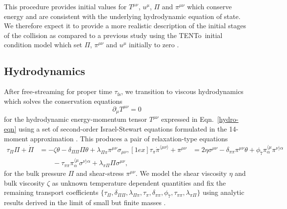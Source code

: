 \documentclass[aps,prc,reprint,amsmath,nofootinbib]{revtex4-1}
\newcommand{\trento}{T\raisebox{-0.5ex}{R}ENTo}
\newcommand{\taufs}{\tau_\mathrm{fs}}
\def\\#1{ #1}
\begin{document}
This procedure provides initial values for $T^{\mu\nu}$, $u^\mu$, $\Pi$ and $\pi^{\mu\nu}$ which conserve energy and are consistent with the underlying hydrodynamic equation of state.
We therefore expect it to provide a more realistic description of the initial stages of the collision as compared to a previous study using the \trento\ initial condition model which set $\Pi$, $\pi^{\mu\nu}$ and $u^\mu$ initially to zero \cite{Bernhard:2016tnd}.

\subsection{Hydrodynamics}

After free-streaming for proper time $\taufs$, we transition to viscous hydrodynamics which solves the conservation equations
\begin{equation}
  \label{eq:continuity}
  \partial_\mu T^{\mu\nu} = 0
\end{equation}
for the hydrodynamic energy-momentum tensor $T^{\mu\nu}$ expressed in Eqn.~\eqref{hydro-eqn} using a set of second-order Israel-Stewart equations formulated in the 14-moment approximation
\cite{Israel:1979wp, Israel:1976aa, Denicol:2012cn, Denicol:2010xn}.
This produces a pair of relaxation-type equations
\begin{subequations}
  \label{eq:relaxation}
  \begin{align}
    \tau_\Pi \Pi + \dot{\Pi} &=
      - \zeta \theta - \delta_{\Pi\Pi} \Pi\theta
      + \lambda_{\Pi\pi} \pi^{\mu\nu} \sigma_{\mu\nu}, \\[1ex]
    \tau_\pi \dot{\pi}^{\langle \mu\nu \rangle} + \pi^{\mu\nu} &=
      2\eta\sigma^{\mu\nu} - \delta_{\pi\pi} \pi^{\mu\nu} \theta
      + \phi_7 \pi_\alpha^{\langle \mu} \pi^{\nu \rangle \alpha} \nonumber \\
      &\qquad {} - \tau_{\pi\pi} \pi_\alpha^{\langle \mu}\sigma^{\nu \rangle \alpha}
      + \lambda_{\pi\Pi} \Pi \sigma^{\mu\nu},
  \end{align}
\end{subequations}
for the bulk pressure $\Pi$ and shear-stress $\pi^{\mu\nu}$.
We model the shear viscosity $\eta$ and bulk viscosity $\zeta$ as unknown temperature dependent quantities and fix the remaining transport coefficients $\{\tau_\Pi, \delta_{\Pi\Pi}, \lambda_{\Pi\pi}, \tau_\pi, \delta_{\pi\pi}, \phi_7, \tau_{\pi\pi}, \lambda_{\pi\Pi}\}$ using analytic results derived in the limit of small but finite masses \cite{Denicol:2014vaa}.
\end{document}

